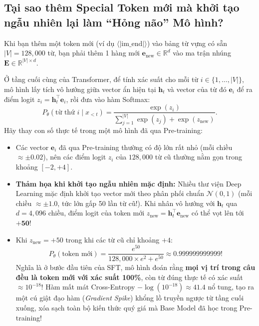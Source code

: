 \subsection{Tại sao thêm Special Token mới mà khởi tạo ngẫu nhiên lại làm ``Hỏng não'' Mô hình?}
Khi bạn thêm một token mới (ví dụ $\langle|\text{im\_end}|\rangle$) vào bảng từ vựng có sẵn $|V| = 128,000$ từ, bạn phải thêm 1 hàng mới $\mathbf{e}_{\text{new}} \in \mathbb{R}^d$ vào ma trận nhúng $\mathbf{E} \in \mathbb{R}^{|V| \times d}$.

\begin{mathdecode}
Ở tầng cuối cùng của Transformer, để tính xác suất cho mỗi từ $i \in \{1, \dots, |V|\}$, mô hình lấy tích vô hướng giữa vector ẩn hiện tại $\mathbf{h}_t$ và vector của từ đó $\mathbf{e}_i$ để ra điểm logit $z_i = \mathbf{h}_t^\top \mathbf{e}_i$, rồi đưa vào hàm Softmax:
\begin{equation}
    P_\theta(\text{từ thứ } i \mid x_{<t}) = \frac{\exp(z_i)}{\sum_{j=1}^{|V|} \exp(z_j) + \exp(z_{\text{new}})}.
\end{equation}
Hãy thay con số thực tế trong một mô hình đã qua Pre-training:
\begin{itemize}[leftmargin=1.2cm]
    \item Các vector $\mathbf{e}_i$ đã qua Pre-training thường có độ lớn rất nhỏ (mỗi chiều $\approx \pm 0.02$), nên các điểm logit $z_i$ của $128,000$ từ cũ thường nằm gọn trong khoảng $[-2, +4]$.
    \item \textbf{Thảm họa khi khởi tạo ngẫu nhiên mặc định:} Nhiều thư viện Deep Learning mặc định khởi tạo vector mới theo phân phối chuẩn $\mathcal{N}(0, 1)$ (mỗi chiều $\approx \pm 1.0$, tức lớn gấp 50 lần từ cũ!). Khi nhân vô hướng với $\mathbf{h}_t$ qua $d = 4,096$ chiều, điểm logit của token mới $z_{\text{new}} = \mathbf{h}_t^\top \mathbf{e}_{\text{new}}$ có thể vọt lên tới $\mathbf{+50}$!
    \item Khi $z_{\text{new}} = +50$ trong khi các từ cũ chỉ khoảng $+4$:
    \begin{equation}
        P_\theta(\text{token mới}) = \frac{e^{50}}{128,000 \times e^2 + e^{50}} \approx \mathbf{0.999999999999!}
    \end{equation}
    Nghĩa là ở bước đầu tiên của SFT, mô hình đoán rằng \textbf{mọi vị trí trong câu đều là token mới với xác suất 100\%}, còn từ đúng thực tế có xác suất $\approx 10^{-18}$! Hàm mất mát Cross-Entropy $-\log(10^{-18}) \approx 41.4$ nổ tung, tạo ra một cú giật đạo hàm (\textit{Gradient Spike}) khổng lồ truyền ngược từ tầng cuối xuống, xóa sạch toàn bộ kiến thức quý giá mà Base Model đã học trong Pre-training!

\end{itemize}
\end{mathdecode}
